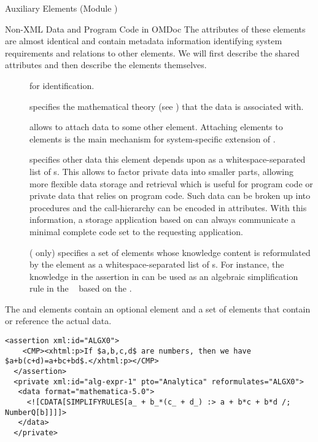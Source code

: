 \begin{tchapter}[id=ext,short=Auxiliary Elements]{Auxiliary Elements (Module {})}
\begin{tsection}[id=private]{Non-XML Data and Program Code in OMDoc}
  The attributes of these elements are almost identical and contain metadata
  information identifying system requirements and relations to other {\omdoc}
  elements. We will first describe the shared attributes and then describe the
  elements themselves.
\begin{description}
\item[{}] for identification.
\item[{}] specifies the mathematical theory (see
  {}) that the data is associated with.
\item[{}] allows to attach data to some other {\omdoc}
  element. Attaching {} elements to {\omdoc} elements is the main
  mechanism for system-specific extension of {\omdoc}.
\item[{}] specifies other data this element depends
  upon as a whitespace-separated list of {s}.  This allows to
  factor private data into smaller parts, allowing more flexible data storage and
  retrieval which is useful for program code or private data that relies on program
  code. Such data can be broken up into procedures and the call-hierarchy can be encoded
  in {} attributes. With this information, a storage
  application based on {\omdoc} can always communicate a minimal complete code set to the
  requesting application.
\item[{}] ({} only) specifies a set of
  {\omdoc} elements whose knowledge content is reformulated by the {}
  element as a whitespace-separated list of {s}. For instance, the
  knowledge in the assertion in {} can be used as an algebraic
  simplification rule in the {}
  {}~\cite{ClaKoh:sda03} based on the {}
  {}.
\end{description}

The {} and {} elements contain an optional
{} element and a set of {} elements that contain
or reference the actual data.

\begin{lstlisting}[label=lst:private-simplify,mathescape,
  caption={Reformulating Mathematical Knowledge},index={private,data}]
  <assertion xml:id="ALGX0">
    <CMP><xhtml:p>If $a,b,c,d$ are numbers, then we have $a+b(c+d)=a+bc+bd$.</xhtml:p></CMP>
  </assertion>
  <private xml:id="alg-expr-1" pto="Analytica" reformulates="ALGX0">
   <data format="mathematica-5.0">
     <![CDATA[SIMPLIFYRULES[a_ + b_*(c_ + d_) :> a + b*c + b*d /; NumberQ[b]]]]>
   </data>
  </private>
\end{lstlisting}


\end{tsection}
\end{tchapter}
